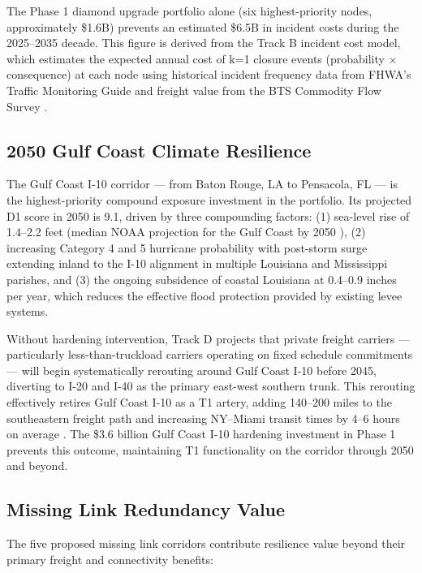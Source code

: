 The Phase 1 diamond upgrade portfolio alone (six highest-priority nodes, approximately \$1.6B) prevents an estimated \$6.5B in incident costs during the 2025--2035 decade. This figure is derived from the Track B incident cost model, which estimates the expected annual cost of k=1 closure events (probability $\times$ consequence) at each node using historical incident frequency data from FHWA's Traffic Monitoring Guide and freight value from the BTS Commodity Flow Survey \citep{FHWA_freight2023}.

\subsection{2050 Gulf Coast Climate Resilience}

The Gulf Coast I-10 corridor --- from Baton Rouge, LA to Pensacola, FL --- is the highest-priority compound exposure investment in the portfolio. Its projected D1 score in 2050 is 9.1, driven by three compounding factors: (1) sea-level rise of 1.4--2.2 feet (median NOAA projection for the Gulf Coast by 2050 \citep{NOAA_SLR2022}), (2) increasing Category 4 and 5 hurricane probability with post-storm surge extending inland to the I-10 alignment in multiple Louisiana and Mississippi parishes, and (3) the ongoing subsidence of coastal Louisiana at 0.4--0.9 inches per year, which reduces the effective flood protection provided by existing levee systems.

Without hardening intervention, Track D projects that private freight carriers --- particularly less-than-truckload carriers operating on fixed schedule commitments --- will begin systematically rerouting around Gulf Coast I-10 before 2045, diverting to I-20 and I-40 as the primary east-west southern trunk. This rerouting effectively retires Gulf Coast I-10 as a T1 artery, adding 140--200 miles to the southeastern freight path and increasing NY--Miami transit times by 4--6 hours on average \citep{ROUTE_D1}. The \$3.6 billion Gulf Coast I-10 hardening investment in Phase 1 prevents this outcome, maintaining T1 functionality on the corridor through 2050 and beyond.

\subsection{Missing Link Redundancy Value}

The five proposed missing link corridors contribute resilience value beyond their primary freight and connectivity benefits:

